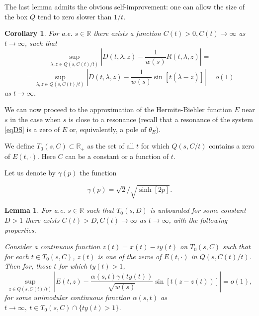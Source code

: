 \documentclass[11pt,twoside,reqno]{amsart}
\def\to{\rightarrow}
\def\R{{\mathbb R}}
\def\l{\lambda}
\def\g{\gamma}
\def\a{\alpha}
\theoremstyle{plain}
\newtheorem{lemma}{Lemma}
\newtheorem{corollary}{Corollary}
\numberwithin{equation}{section}
\begin{document}


The last lemma admits the obvious self-improvement: one can allow the size of the
box $Q$ tend to zero slower than $1/t$.

\begin{corollary}\label{cor01}
For a.e. $s\in \R$ there exists a function $C(t)>0, C(t)\to\infty$ as $t\to\infty$, such that
\begin{equation}
\sup_{\l,z\in Q(s,C(t)/t)}\left|D(t,\l,z)-\frac{1}{w(s)}R(t,\l,z)\right|=\label{eqDet}
\end{equation}
$$=\sup_{\l,z\in Q(s,C(t)/t)}\left|D(t,\l,z)-\frac{1}{w(s)}\sin [t(\bar \l -z)]\right|=o(1)
$$
as $t\to\infty$.


\end{corollary}


We can now proceed to the approximation of the Hermite-Biehler function $E$ near $s$ in the case when $s$ is close to a resonance (recall that a resonance of the system \eqref{eqDS} is a zero of $E$ or, equivalently, a pole of $\theta_E$).

We define $T_0(s,C)\subset \R_+$ as the set of all $t$ for which
$Q(s,C/t)$ contains a zero  of $E(t,\cdot)$. Here $C$ can be a constant or a function of $t$.

Let us denote by $\g(p)$ the function 

\begin{equation}\g(p)=\sqrt{2}/\sqrt{\sinh [2p]}.\label{eqGamma}\end{equation}

\begin{lemma}\label{sinus} For a.e. $s\in \R$ such that $T_0(s,D)$ is unbounded for some constant $D>1$
there exists $C(t)>D, C(t)\to\infty$ as $t\to\infty$, with the following properties.

 Consider a continuous function $z(t)=x(t)-iy(t)$ on $T_0(s,C)$ such that for each $t\in T_0(s,C)$, $z(t)$ is one of the zeros of $E(t,\cdot) $  in $Q(s,C(t)/t)$. Then for, those $t$ for which $ty(t)>1$,
\begin{equation}\sup_{z\in Q(s,C(t)/t)} \left|E(t,z)- \frac {\a(s,t)\g(ty(t))}{\sqrt{w(s)}}\sin [t(z - z(t))]\right|=o(1),\label{eq1701}\end{equation}
 for some unimodular continuous function $\a(s,t)$ as $t\to\infty,\ t\in T_0(s,C)\cap \{ty(t)>1\}$.
\end{lemma}
\end{document}
